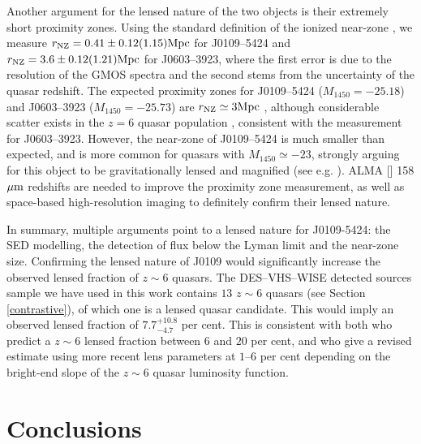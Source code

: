 \documentclass[fleqn,usenatbib]{mnras}
\begin{document}
Another argument for the lensed nature of the two objects is their extremely short proximity zones.
Using the standard definition of the ionized near-zone \citep{Eilers2021}, we measure $r_\text{NZ}= 0.41 \pm 0.12(1.15) \rm{Mpc}$ for J0109--5424 and $r_\text{NZ} = 3.6 \pm 0.12 (1.21) \rm{Mpc}$ for J0603--3923, where the first error is due to the resolution of the GMOS spectra and the second stems from the uncertainty of the quasar redshift.
The expected proximity zones for J0109--5424 ($M_{1450} = -25.18$) and J0603--3923 ($M_{1450} = -25.73$) are $r_\text{NZ}\simeq 3 \rm{Mpc}$ \citep{Eilers2017}, although considerable scatter exists in the $z=6$ quasar population \citep{Eilers2021,Satyavolu2023}, consistent with the measurement for J0603--3923.
However, the near-zone of J0109--5424 is much smaller than expected, and is more common for quasars with $M_{1450} \simeq -23$, strongly arguing for this object to be gravitationally lensed and magnified (see e.g. \citealt{Davies2020}).
ALMA [] 158 $\mu \rm{m}$ redshifts are needed to improve the proximity zone measurement, as well as space-based high-resolution imaging to definitely confirm their lensed nature. 

In summary, multiple arguments point to a lensed nature for J0109-5424: the SED modelling, the detection of flux below the Lyman limit and the near-zone size. Confirming the lensed nature of J0109 would significantly increase the observed lensed fraction of $z\sim 6$ quasars.
The DES--VHS--WISE detected sources sample we have used in this work contains $13$ $z\sim6$ quasars (see Section \ref{contrastive}), of which one is a lensed quasar candidate.
This would imply an observed lensed fraction of $7.7_{-4.7}^{+10.8}$ per cent.
This is consistent with both \citet{pacucci19} who predict a $z\sim 6$ lensed fraction between $6$ and $20$ per cent, and \citet{minghao22} who give a revised estimate using more recent lens parameters at $1$--$6$ per cent depending on the bright-end slope of the $z\sim 6$ quasar luminosity function. 

\section{Conclusions} \label{conc}
\end{document}

